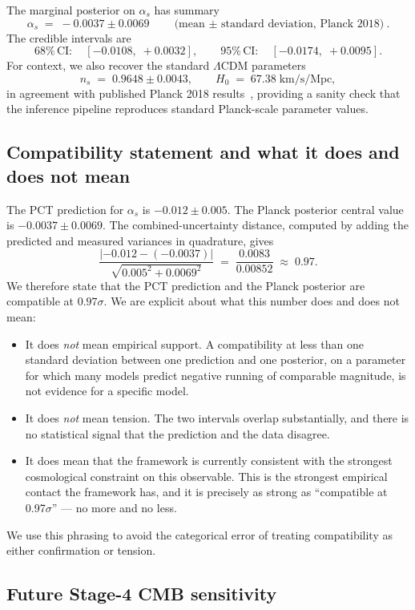 ﻿\documentclass[12pt,a4paper]{article}
\theoremstyle{definition}
\begin{document}
The marginal posterior on $\alpha_s$ has summary
\[
\alpha_s \;=\; -0.0037 \pm 0.0069 \qquad \text{(mean $\pm$ standard deviation, Planck 2018)}.
\]
The credible intervals are
\[
\mathrm{68\% \, CI}:\quad [-0.0108,\; +0.0032], \qquad \mathrm{95\% \, CI}:\quad [-0.0174,\; +0.0095].
\]
For context, we also recover the standard $\Lambda$CDM parameters
\[
n_s \;=\; 0.9648 \pm 0.0043, \qquad H_0 \;=\; 67.38 \; \mathrm{km/s/Mpc},
\]
in agreement with published Planck 2018 results~\citep{planck2018}, providing a sanity check that the inference pipeline reproduces standard Planck-scale parameter values.

\subsection{Compatibility statement and what it does and does not mean}
\label{sec:planck_compat}

The PCT prediction for $\alpha_s$ is $-0.012 \pm 0.005$. The Planck posterior central value is $-0.0037 \pm 0.0069$. The combined-uncertainty distance, computed by adding the predicted and measured variances in quadrature, gives
\[
\frac{|{-}0.012 - ({-}0.0037)|}{\sqrt{0.005^2 + 0.0069^2}} \;=\; \frac{0.0083}{0.00852} \;\approx\; 0.97.
\]
We therefore state that the PCT prediction and the Planck posterior are compatible at $0.97\sigma$. We are explicit about what this number does and does not mean:
\begin{itemize}
  \item It does \emph{not} mean empirical support. A compatibility at less than one standard deviation between one prediction and one posterior, on a parameter for which many models predict negative running of comparable magnitude, is not evidence for a specific model.
  \item It does \emph{not} mean tension. The two intervals overlap substantially, and there is no statistical signal that the prediction and the data disagree.
  \item It does mean that the framework is currently consistent with the strongest cosmological constraint on this observable. This is the strongest empirical contact the framework has, and it is precisely as strong as ``compatible at 0.97$\sigma$'' --- no more and no less.
\end{itemize}
We use this phrasing to avoid the categorical error of treating compatibility as either confirmation or tension.

\subsection{Future Stage-4 CMB sensitivity}
\label{sec:planck_cmbs4}
\end{document}
